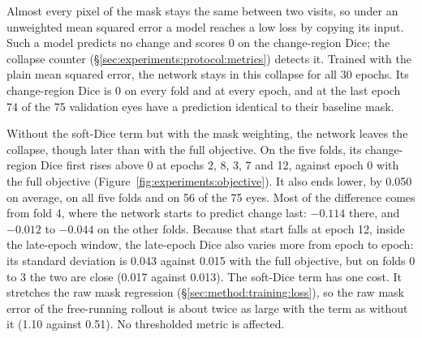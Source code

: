 Almost every pixel of the mask stays the same between two visits, so under
an unweighted mean squared error a model reaches a low loss by copying its
input. Such a model predicts no change and scores 0 on the change-region
Dice; the collapse counter (\S\ref{sec:experiments:protocol:metrics})
detects it. Trained with the plain mean squared error, the network stays in
this collapse for all 30 epochs. Its change-region Dice is 0 on every fold
and at every epoch, and at the last epoch 74 of the 75 validation eyes have
a prediction identical to their baseline mask.

Without the soft-Dice term but with the mask weighting, the network leaves
the collapse, though later than with the full objective. On the five
folds, its change-region Dice first rises above 0 at epochs 2, 8, 3, 7 and
12, against epoch 0 with the full objective
(Figure~\ref{fig:experiments:objective}). It also ends lower, by 0.050 on
average, on all five folds and on 56 of the 75 eyes. Most of the difference
comes from fold 4, where the network starts to predict change last:
$-0.114$ there, and $-0.012$ to $-0.044$ on the other folds. Because that
start falls at epoch 12, inside the late-epoch window, the late-epoch Dice
also varies more from epoch to epoch: its standard deviation is 0.043
against 0.015 with the full objective, but on folds 0 to 3 the two are
close (0.017 against 0.013).
The soft-Dice term has one cost. It stretches the raw mask regression
(\S\ref{sec:method:training:loss}), so the raw mask error of the
free-running rollout is about twice as large with the term as without it
(1.10 against 0.51). No thresholded metric is affected.

